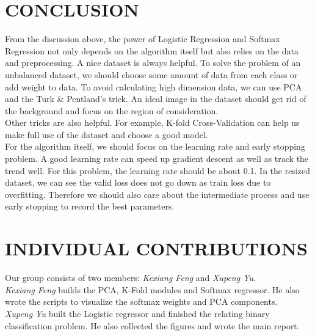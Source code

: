 \documentclass{article} %
\begin{document}
\section {CONCLUSION}
From the discussion above, the power of Logistic Regression and Softmax Regression not only depends on the algorithm itself but also relies on the data and preprocessing.
A nice dataset is always helpful. To solve the problem of an unbalanced dataset, we should choose some amount of data from each class or add weight to data. To avoid calculating high dimension data, we can use PCA and the Turk \& Pentland's trick. An ideal image in the dataset should get rid of the background and focus on the region of consideration.\\
Other tricks are also helpful. For example, K-fold Cross-Validation can help us make full use of the dataset and choose a good model.\\
For the algorithm itself, we should focus on the learning rate and early stopping problem. A good learning rate can speed up gradient descent as well as track the trend well. For this problem, the learning rate should be about 0.1. In the resized dataset, we can see the valid loss does not go down as train loss due to overfitting. Therefore we should also care about the intermediate process and use early stopping to record the best parameters.
\section{INDIVIDUAL CONTRIBUTIONS}
Our group consists of two members: \textit{Kexiang Feng} and \textit{Xupeng Yu}. \\
\textit{Kexiang Feng} builds the PCA, K-Fold modules and Softmax regressor. He also wrote the scripts to visualize the softmax weights and PCA components. \\
\textit{Xupeng Yu} built the Logistic regressor and finished the relating binary classification problem. He also collected the figures and wrote the main report. 




\end{document}
